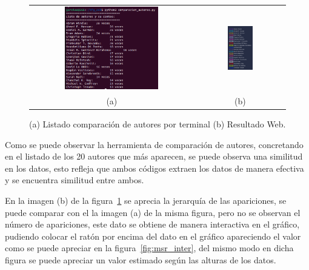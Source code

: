 \documentclass[a4paper, 12pt]{book}
\begin{document}
\begin{figure}[h]
    \centering
    \begin{tabular}{cc}
    \includegraphics[width=0.595\textwidth]{img/MSR_list_count.png} &  
    \includegraphics[width=0.3\textwidth]{img/MSR_list_l.png} \\
    (a) &(b)
    \end{tabular}
    \caption{(a) Listado comparación de autores por terminal (b) Resultado Web.}
    \label{fig:comp_MSR}
\end{figure}


Como se puede observar la herramienta de comparación de autores, concretando en el listado de los 20 autores que más aparecen, se puede observa una similitud en los datos, esto refleja que ambos códigos extraen los datos de manera efectiva y se encuentra similitud entre ambos. 

En la imagen (b) de la figura~\ref{fig:comp_MSR} se aprecia la jerarquía de las apariciones, se puede comparar con el la imagen (a) de la misma figura, pero no se observan el número de apariciones, este dato se obtiene de manera interactiva en el gráfico, pudiendo colocar el ratón por encima del dato en el gráfico apareciendo el valor como se puede apreciar en la figura~\ref{fig:msr_inter}, del mismo modo en dicha figura se puede apreciar un valor estimado según las alturas de los datos.
\end{document}
